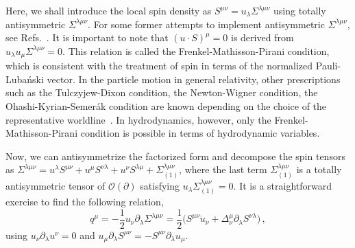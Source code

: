 \documentclass[prl,superscriptaddress,twocolumn,
  showpacs,preprintnumbers,amsmath,amssymb]{revtex4-1}
\begin{document}
Here, we shall introduce the local spin density as $S^{\mu\nu} = u_\lambda \Sigma^{\lambda\mu\nu}$ using totally antisymmetric $\Sigma^{\lambda\mu\nu}$.  For some former attempts to implement antisymmetric $\Sigma^{\lambda\mu\nu}$, see Refs.~\cite{Hongo:2021ona,Cao:2022aku}.  It is important to note that $(u\cdot S)^\mu=0$ is derived from $u_\lambda u_\mu \Sigma^{\lambda\mu\nu}=0$.  This relation is called the Frenkel-Mathisson-Pirani condition, which is consistent with the treatment of spin in terms of the normalized Pauli-Luba\'{n}ski vector.  In the particle motion in general relativity, other prescriptions such as the Tulczyjew-Dixon condition, the Newton-Wigner condition, the Ohashi-Kyrian-Semer\'ak condition are known depending on the choice of the representative worldline~\cite{Costa:2017kdr}.  In hydrodynamics, however, only the Frenkel-Mathisson-Pirani condition is possible in terms of hydrodynamic variables.

Now, we can antisymmetrize the factorized form and decompose the spin tensors as $\Sigma^{\lambda\mu\nu}  =  u^{\lambda}S^{\mu\nu}+u^{\mu}S^{\nu\lambda}+u^{\nu}S^{\lambda\mu}+\Sigma_{(1)}^{\lambda\mu\nu}$, where the last term $\Sigma_{(1)}^{\lambda\mu\nu}$ is a totally antisymmetric tensor of $\mathcal{O}(\partial)$ satisfying $u_\lambda \Sigma_{(1)}^{\lambda\mu\nu}=0$.  It is a straightforward exercise to find the following relation,
\begin{equation}
  q^\mu
  = -\frac{1}{2} u_\nu \partial_\lambda \Sigma^{\lambda\mu\nu}
  = \frac{1}{2} \bigl( S^{\mu\nu} \dot{u}_\nu + \Delta^{\mu}_{\nu} \partial_\lambda S^{\nu\lambda} \bigr)\,,
  \label{eq:qmu}
\end{equation}
using $u_\nu\partial_\lambda u^\nu=0$ and $u_\mu\partial_\lambda S^{\mu\nu}=-S^{\mu\nu} \partial_\lambda u_\mu$.
\end{document}
